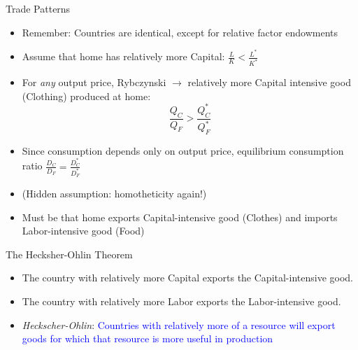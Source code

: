 \documentclass[ignorenonframetext,]{beamer}
\begin{document}
\begin{frame}{Trade Patterns}

    \begin{itemize}
        \item Remember: Countries are identical, except for relative factor endowments 
        \item Assume that home has relatively more Capital: $\frac{L}{K} < \frac{L^*}{K^*}$
        \item For \emph{any} output price, Rybczynski $\rightarrow$ relatively more Capital intensive good (Clothing) produced at home:
            \begin{equation*}
                \frac{Q_C}{Q_F} > \frac{Q_C^*}{Q_F^*}
            \end{equation*}
        \item Since consumption depends only on output price, equilibrium consumption ratio $\frac{D_C}{D_F} = \frac{D_C^*}{D_F^*}$
        \item (Hidden assumption: homotheticity again!)
        \item Must be that home exports Capital-intensive good (Clothes) and imports Labor-intensive good (Food)
    \end{itemize}

\end{frame}
            
\begin{frame}{The Hecksher-Ohlin Theorem}

    \begin{itemize}
            \item The country with relatively more Capital exports the Capital-intensive good.
            \item The country with relatively more Labor exports the Labor-intensive good.
            \item \emph{Heckscher-Ohlin}: \textcolor{blue}{Countries with relatively more of a resource will export goods for which that resource is more useful in production}
    \end{itemize}
\end{frame}
\end{document}
